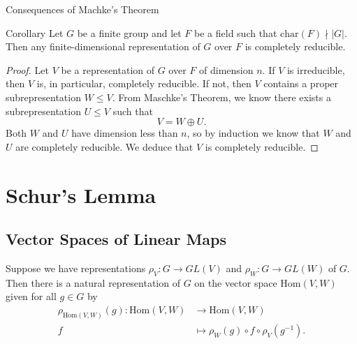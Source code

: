 \begin{frame}{Consequences of Machke's Theorem}
\begin{block}{Corollary}
Let $G$ be a finite group and let $F$ be a field such that $\text{char}(F) \nmid |G|$. Then any finite-dimensional representation of $G$ over $F$ is completely reducible.
\end{block}
\begin{proof}
Let $V$ be a representation of $G$ over $F$ of dimension $n$.  If $V$ is irreducible, then $V$ is, in particular, completely reducible.  If not, then $V$ contains a proper subrepresentation $W \leq V$.  From Maschke's Theorem, we know there exists a subrepresentation $U \leq V$ such that 
\begin{equation}  V = W \oplus U. \end{equation}
Both $W$ and $U$ have dimension less than $n$, so by induction we know that $W$ and $U$ are completely reducible. We deduce that $V$ is completely reducible.
\end{proof}
\end{frame}

\section{Schur's Lemma}
\subsection{Vector Spaces of Linear Maps}

\begin{frame}
\begin{proposition}
Suppose we have representations $\rho_V \colon G \to GL(V)$ and $\rho_W \colon G \to GL(W)$ of $G$. Then there is a natural representation of $G$ on the vector space $\text{Hom}(V,W)$ given for all $g \in G$ by
\begin{align*}		
 \rho_{\text{Hom}(V,W)}(g)  \colon \text{Hom}(V,W) &\to \text{Hom}(V,W) \\		
 f &\mapsto \rho_{W}(g) \circ f \circ \rho_{V}(g^{-1}).
 \end{align*}		
\end{proposition}		
\end{frame}

